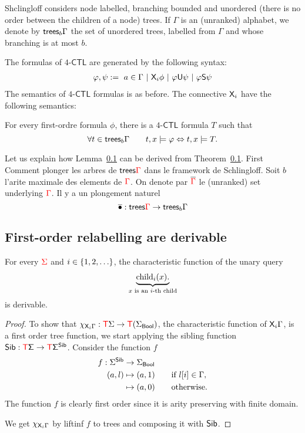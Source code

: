 Shclingloff considers node labelled, branching bounded and   unordered (there is no order between the children of a node) trees. If $\Gamma$ is an (unranked) alphabet, we denote by $\mathsf {trees}_b\Gamma$ the set of unordered trees, labelled from $\Gamma$ and whose branching is at most $b$.   


The formulas of $4$-$\mathsf{CTL}$ are generated by the following syntax:
\begin{align*}
\varphi, \psi:= \ a\in \Gamma \ | \ \nextmod_i \phi \ | \ \varphi\untilmod \psi \ | \ \varphi\sincemod\psi  
\end{align*}
The semantics of $4$-$\mathsf{CTL}$ formulas is as before. The connective $\mathsf X_i$ have the following semantics:

\begin{theorem}\cite{}%
For every first-ordre formula $\phi$, there is a $4$-$\mathsf{CTL}$ formula $T$ such that
$$ \forall t\in \mathsf {trees}_b \Gamma \qquad t,x\models \varphi \Leftrightarrow t,x\models T.$$
\end{theorem} 
 Let us explain how Lemma~\ref{} can be derived from Theorem~\ref{}. First Comment plonger les arbres de $\mathsf {trees} {\color{red}{\Gamma}}$ dans le framework de Schlingloff. Soit $b$ l'arite maximale des elements de ${\color{red}{\Gamma}}$. On denote par $\overline{{\color{red}{\Gamma}}}$ le (unranked) set underlying ${\color{red}{\Gamma}}$. 
Il y a un plongement naturel 
$$ \overline{\bullet}: \mathsf {trees}{\color{red}{\Gamma}} \to \mathsf {trees}_b\Gamma$$
 
\subsection{First-order relabelling are derivable}

\begin{lemma}\label{lem:nextmod}
  For every ${\color{red}{\Sigma}}$ and  $i \in \{1,2,\ldots\}$, the characteristic function of the  unary query 
        \begin{align*}
            \underbrace{\mathrm{child}_{i} (x).}_{\text{$x$ is an $i$-th child}}
        \end{align*}
        is derivable.
\end{lemma}
\begin{proof}
To show that $\chi_{\mathsf X_i \Gamma}:{\color{red}{\mathsf T}} \Sigma\to {\color{red}{\mathsf T}}{(\Sigma_{\sf{Bool}})}$,  the characteristic function of $\mathsf X_i \Gamma$, is a first order tree function, we start applying the sibling function $\sf{Sib}:{\color{red}{\mathsf T}}\Sigma\to {\color{red}{\mathsf T}} \Sigma^{\sf{Sib}}$. Consider the function $f$
\begin{align*}
f:\Sigma^{\sf{Sib}} &\to \Sigma_{\sf{Bool}}\\
(a,l)& \mapsto (a,1) \qquad\text{if } l[i]\in\Gamma, \\
& \mapsto (a,0) \qquad\text{otherwise.}   \end{align*}
The function $f$ is clearly first order since it is arity preserving with finite domain.    

We get $\chi_{\mathsf X_i \Gamma}$ by liftinf $f$ to trees and composing it with $\sf{Sib}$. 
\end{proof}

